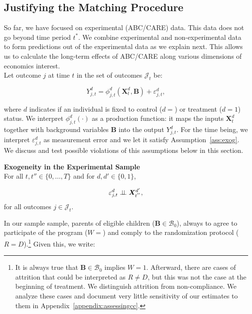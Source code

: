 \begin{figure}
\end{figure}

\subsection{Justifying the Matching Procedure} \label{section:just}

\noindent So far, we have focused on experimental (ABC/CARE) data. This data does not go beyond time period $t^*$. We combine experimental and non-experimental data to form predictions out of the experimental data as we explain next. This allows us to calculate the long-term effects of ABC/CARE along various dimensions of economics interest.\\

\noindent Let outcome $j$ at time $t$ in the set of outcomes $\mathcal{J}_{t}$ be: 

\begin{equation}
Y_{j,t}^d = \phi_{j,t}^d \left( \bm{X}_{t}^d, \bm{B} \right) + \varepsilon_{j,t}^d, \label{eq:outcome}
\end{equation}

\noindent where $d$ indicates if an individual is fixed to control ($d = $) or treatment ($d = 1$) status. We interpret  $\phi_{j,t}^d \left( \cdot \right)$ as a production function: it maps the inputs $\bm{X}_{t}^d$ together with background variables $\bm{B}$ into the output $Y_{j,t}^d$. For the time being, we interpret $\varepsilon_{j,t}^d$ as measurement error and we let it satisfy Assumption~\ref{ass:exog}. We discuss and test possible violations of this assumptions below in this section.

\begin{assumption}\label{ass:exog} \textbf{Exogeneity in the Experimental Sample}\\
For all $t, t'' \in \{ 0, \ldots, T \}$ and for $d, d' \in \{0,1\}$,

\begin{equation}
\varepsilon^d_{j,t} \perp\!\!\!\perp \bm{X}^{d^{\prime}}_{t^{''}},
\end{equation}
\noindent for all outcomes $j \in \mathcal{J}_{t}$.
\end{assumption}

\noindent In our sample sample, parents of eligible children ($\bm{B} \in \mathcal{B}_{0}$), always to agree to participate of the program ($W = $) and comply to the randomization protocol ($R = D$).\footnote{It is always true that $\bm{B} \in \mathcal{B}_{0}$ implies $W = 1$. Afterward, there are cases of attrition that could be interpreted as $R \neq D$, but this was not the case at the beginning of treatment. We distinguish attrition from non-compliance. We analyze these cases and document very little sensitivity of our estimates to them in Appendix~\ref{appendix:assessingcc}.} Given this, we write:

